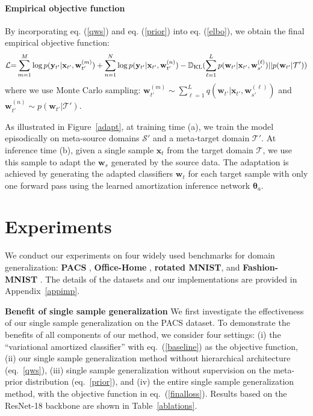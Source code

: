 \documentclass{article} \usepackage[table]{xcolor}
\newcommand{\x}{\mathbf{x}}
\newcommand{\y}{\mathbf{y}}
\newcommand{\w}{\mathbf{w}}
\newcommand{\btheta}{\boldsymbol{\theta}}
\begin{document}
\vspace{-2mm}
\paragraph{Empirical objective function} 
By incorporating eq. (\ref{qws}) and eq. (\ref{prior}) into eq. (\ref{elbo}), we obtain the final empirical objective function:
\begin{equation}
\label{finalloss}
    \mathcal{L} {=} \sum^M_{m=1} \log p(\y_{t'}|\x_{t'},\w^{(m)}_{t'}) + \sum^N_{n=1} \log p(\y_{t'}|\x_{t'},\w^{(n)}_{t'}) - \mathbb{D}_{\rm{KL}}(\sum^{L}_{\ell=1}p(\w_{t'}|\x_{t'}, \w^{(\ell)}_{s'})||p(\w_{t'}|\mathcal{T'}))
\end{equation}
where we use Monte Carlo sampling: $\w^{(m)}_{t'} \sim \sum^{L}_{\ell=1}q(\w_{t'}|\x_{t'}, \w^{(\ell)}_{s'})$ and $\w^{(n)}_{t'} \sim p(\w_{t'}|\mathcal{T'})$.

As illustrated in Figure~\ref{adapt}, at training time (a), we train the model episodically 
on meta-source domains $\mathcal{S}'$ and a meta-target domain $\mathcal{T}'$. At inference time (b), given a single sample $\mathbf{x}_t$ from the target domain $\mathcal{T}$, we use this sample to adapt the $\w_{s}$ generated by the source data. 
The adaptation is achieved by generating the adapted classifiers $\w_{t}$ for each target sample with only one forward pass using the learned amortization inference network $\btheta_{a}$.


\vspace{-1mm}
\section{Experiments}
\vspace{-1mm}

We conduct our experiments on four widely used benchmarks for domain generalization: \textbf{PACS} \citep{li2017deeper}, \textbf{Office-Home} \citep{venkateswara2017deep}, \textbf{rotated MNIST}, and \textbf{Fashion-MNIST} \citep{piratla2020efficient}.
The details of the datasets and our implementations are provided in Appendix~\ref{appimp}.











\textbf{Benefit of single sample generalization}
We first investigate the effectiveness of our single sample generalization on the PACS dataset.
To demonstrate the benefits of all components of our method, we consider four settings: 
(i) the ``variational amortized classifier'' with eq.~(\ref{baseline}) as the objective function, (ii) our single sample generalization method without hierarchical architecture (eq.~\ref{qws}), (iii) single sample generalization without supervision on the meta-prior distribution (eq.~\ref{prior}), and (iv) the entire single sample generalization method, with the objective function in eq.~(\ref{finalloss}). 
Results based on the ResNet-18 backbone are shown in Table~\ref{ablations}.
\end{document}
